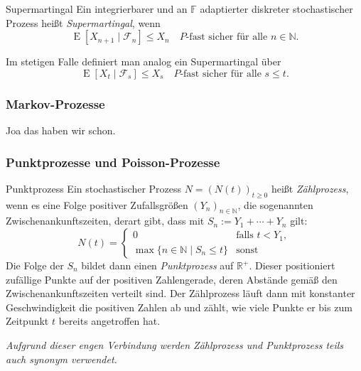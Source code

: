 \begin{defi}[Martingal]{Supermartingal}
    Ein integrierbarer und an $\mathbb{F}$ adaptierter diskreter stochastischer Prozess heißt \emph{Supermartingal}, wenn
    \[
        \operatorname{E} [X_{n+1} \mid{\mathcal{F}}_{n}] \leq X_{n} \quad P\text{-fast sicher für alle } n\in \mathbb{N}.
    \]

    Im stetigen Falle definiert man analog ein Supermartingal über
    \[
        \operatorname{E} [X_{t} \mid{\mathcal{F}}_{s}] \leq X_{s} \quad P\text{-fast sicher für alle } s\leq t.
    \]
\end{defi}

\subsubsection{Markov-Prozesse}

Joa das haben wir schon.

\subsubsection{Punktprozesse und Poisson-Prozesse}

\begin{defi}{Punktprozess}
    Ein stochastischer Prozess $N=(N(t))_{t\geq 0}$ heißt \emph{Zählprozess}, wenn es eine Folge positiver Zufallsgrößen $(Y_{n})_{n\in \mathbb{N}}$, die sogenannten Zwischenankunftszeiten, derart gibt, dass mit $S_{n}:=Y_{1}+\dotsb +Y_{n}$ gilt:
    \[
        N(t) =
        \begin{cases}
            0                                             & \text{falls } t < Y_{1}, \\
            \max \{ n \in \mathbb{N} \mid S_{n} \leq t \} & \text{sonst}
        \end{cases}
    \]
    Die Folge der $S_{n}$ bildet dann einen \emph{Punktprozess} auf $\mathbb{R}^{+}$.
    Dieser positioniert zufällige Punkte auf der positiven Zahlengerade, deren Abstände gemäß den Zwischenankunftszeiten verteilt sind.
    Der Zählprozess läuft dann mit konstanter Geschwindigkeit die positiven Zahlen ab und zählt, wie viele Punkte er bis zum Zeitpunkt $t$ bereits angetroffen hat.

    \textit{Aufgrund dieser engen Verbindung werden Zählprozess und Punktprozess teils auch synonym verwendet.}
\end{defi}

